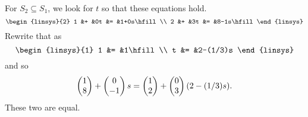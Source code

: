 \begin{exercises}
\begin{answer}
\begin{exparts}
        For \( S_2\subseteq S_1 \), we look for \( t \) so that
        these equations hold.
        \begin{equation*}
          \begin{linsys}{2}
            1  &+  &0t  &=  &1+0s\hfill  \\
            2  &+  &3t  &=  &8-1s\hfill  
          \end{linsys}
        \end{equation*}
        Rewrite that as
        \begin{equation*}
          \begin{linsys}{1}
            1 &= &1\hfill   \\
            t &= &2-(1/3)s
          \end{linsys}
        \end{equation*}
        and so
        \begin{equation*}
          \begin{pmatrix} 1 \\ 8 \end{pmatrix}
          +\begin{pmatrix} 0 \\ -1 \end{pmatrix}s
          =\begin{pmatrix} 1 \\ 2 \end{pmatrix}
          +\begin{pmatrix} 0 \\ 3 \end{pmatrix}(2-(1/3)s).
        \end{equation*}
      \partsitem These two are equal.


\end{exparts}
\end{answer}
\end{exercises}
